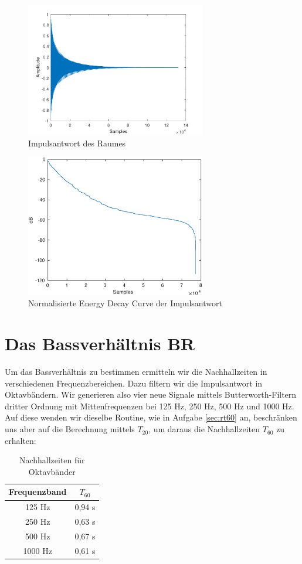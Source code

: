 \begin{figure}[H]
    \center
    \includegraphics[width = 0.7\textwidth]{figures/samples}
    \caption{Impulsantwort des Raumes}
    \label{fig:im}
\end{figure}

\begin{figure}[H]
    \center
    \includegraphics[width = 0.7\textwidth]{figures/EDC_norm.eps}
    \caption{Normalisierte Energy Decay Curve der Impulsantwort}
    \label{fig:edc}
\end{figure}

\section{Das Bassverhältnis $\mathbf{BR}$}
\label{sec:br}
Um das Bassverhältnis zu bestimmen ermitteln wir die Nachhallzeiten in verschiedenen Frequenzbereichen. Dazu filtern wir die Impulsantwort in Oktavbändern.
Wir generieren also vier neue Signale mittels Butterworth-Filtern dritter Ordnung mit Mittenfrequenzen bei 125 Hz, 250 Hz, 500 Hz und 1000 Hz. Auf diese wenden wir dieselbe Routine, wie in Aufgabe \ref{sec:rt60} an, beschränken uns aber auf die Berechnung mittels $T_{20}$, um daraus die Nachhallzeiten $T_{60}$ zu erhalten:
\begin{table}[H]
\centering
\caption{Nachhallzeiten für Oktavbänder}
\label{tab:T_band}
\begin{tabular}{ | c | c |}
\hline
  Frequenzband & $T_{60}$ \\
  \hline
  125 Hz &  0,94 s \\
  250 Hz & 0,63 s \\
  500 Hz & 0,67 s \\
  1000 Hz & 0,61 s  \\
  \hline
  \end{tabular}
\end{table}


